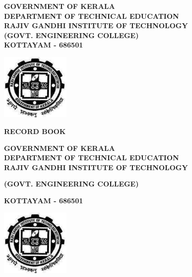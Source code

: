 \documentclass{report}
\theoremstyle{mytheor}
\begin{document}

\begin{titlepage}
\centering

\textbf{\Large GOVERNMENT OF KERALA}\\
\vspace{0.85cm}
\textbf{\Large DEPARTMENT OF TECHNICAL EDUCATION}\\
\vspace{1.5cm}
\textbf{\Large RAJIV GANDHI INSTITUTE OF TECHNOLOGY}\\
\vspace{0.85cm}
\textbf{\Large (GOVT. ENGINEERING COLLEGE)}\\
\vspace{0.85cm}
\textbf{\Large KOTTAYAM - 686501}
\vspace{5.35cm}

\centerline{\includegraphics[width=0.25\textwidth]{image.png}} %

\vspace{6.5cm}

\textbf{\Large RECORD BOOK}

\vspace{0.9cm}
\newpage
\thispagestyle{empty}
\textbf{\Large GOVERNMENT OF KERALA}\\
\vspace{0.9cm}
\textbf{\Large DEPARTMENT OF TECHNICAL EDUCATION}\\
\vspace{0.9cm}
\textbf{\Large RAJIV GANDHI INSTITUTE OF TECHNOLOGY}\\
\vspace{0.9cm}

\textbf{\Large (GOVT. ENGINEERING COLLEGE)}\\
\vspace{0.9cm}

\textbf{\Large KOTTAYAM - 686501}

\vspace{1.35cm}
\centerline{\includegraphics[width=0.25\textwidth]{image.png}} %
\vspace{1cm}


\end{titlepage}
\end{document}
